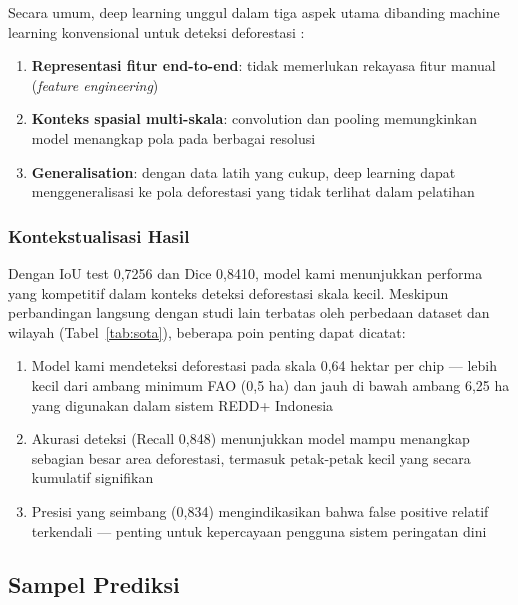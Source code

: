 \documentclass[12pt,a4paper]{article}
\begin{document}
Secara umum, deep learning unggul dalam tiga aspek utama dibanding
machine learning konvensional untuk deteksi deforestasi
\cite{zhu2017deep, ma2019deep}:

\begin{enumerate}[nosep]
    \item \textbf{Representasi fitur end-to-end}: tidak memerlukan
          rekayasa fitur manual (\textit{feature engineering})
    \item \textbf{Konteks spasial multi-skala}: convolution dan
          pooling memungkinkan model menangkap pola pada berbagai
          resolusi
    \item \textbf{Generalisation}: dengan data latih yang cukup,
          deep learning dapat menggeneralisasi ke pola deforestasi
          yang tidak terlihat dalam pelatihan
\end{enumerate}

\subsubsection{Kontekstualisasi Hasil}
\label{subsubsec:konteks}

Dengan IoU test 0,7256 dan Dice 0,8410, model kami menunjukkan
performa yang kompetitif dalam konteks deteksi deforestasi skala
kecil. Meskipun perbandingan langsung dengan studi lain terbatas
oleh perbedaan dataset dan wilayah (Tabel~\ref{tab:sota}), beberapa
poin penting dapat dicatat:

\begin{enumerate}[nosep]
    \item Model kami mendeteksi deforestasi pada skala 0,64 hektar
          per chip — lebih kecil dari ambang minimum FAO (0,5 ha)
          dan jauh di bawah ambang 6,25 ha yang digunakan dalam
          sistem REDD+ Indonesia
    \item Akurasi deteksi (Recall 0,848) menunjukkan model mampu
          menangkap sebagian besar area deforestasi, termasuk
          petak-petak kecil yang secara kumulatif signifikan
          \cite{xu2026nature}
    \item Presisi yang seimbang (0,834) mengindikasikan bahwa
          false positive relatif terkendali — penting untuk
          kepercayaan pengguna sistem peringatan dini
\end{enumerate}

\subsection{Sampel Prediksi}
\end{document}
